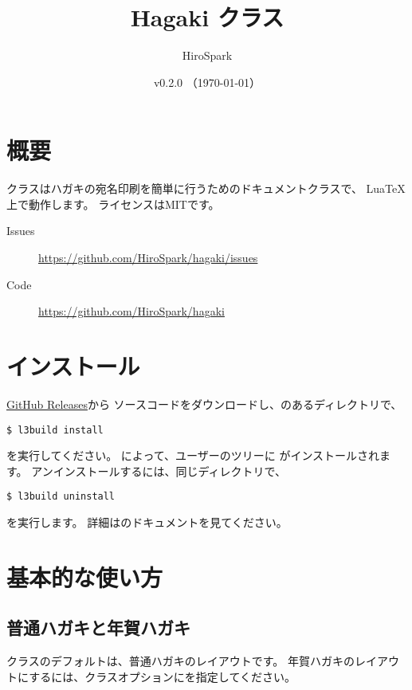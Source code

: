 \documentclass{hagaki-doc}
\title{Hagaki クラス}
\author{HiroSpark}
\date{v0.2.0 （\today）}
\begin{document}
\maketitle

\section{概要}

クラスはハガキの宛名印刷を簡単に行うためのドキュメントクラスで、
Lua\TeX{}上で動作します。
ライセンスはMITです。

\begin{description}
  \item[Issues] \url{https://github.com/HiroSpark/hagaki/issues}
  \item[Code] \url{https://github.com/HiroSpark/hagaki}
\end{description}

\section{インストール}

\href{https://github.com/HiroSpark/hagaki/releases/}{GitHub Releases}から
ソースコードをダウンロードし、のあるディレクトリで、

\begin{lstlisting}
$ l3build install
\end{lstlisting}

を実行してください。
によって、ユーザーのツリーに
がインストールされます。
アンインストールするには、同じディレクトリで、

\begin{lstlisting}
$ l3build uninstall
\end{lstlisting}

を実行します。
詳細はのドキュメントを見てください。

\section{基本的な使い方}

\subsection{普通ハガキと年賀ハガキ}

クラスのデフォルトは、普通ハガキのレイアウトです。
年賀ハガキのレイアウトにするには、クラスオプションにを指定してください。
\end{document}
